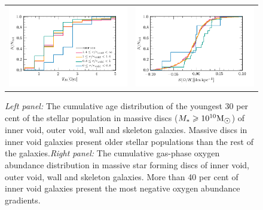 \documentclass[a4paper,fleqn,usenatbib,letter]{mnras}
\newcommand{\Msun}{\rm M_{\sun}}
\begin{document}
\begin{figure}	
    \begin{tabular}{cc}
	\includegraphics[width=1\columnwidth]{plots_parent_sample/T30_fraction_threeregionscum.png} &
	\includegraphics[width=1\columnwidth]{plots_parent_sample/SOH_fraction_threeregionscum.png} \\
	\end{tabular}
    \caption{\textit{ Left panel:} The cumulative  age distribution  of the youngest 30 per cent of the stellar population in massive discs ($M_{*}\geq 10^{10}\Msun$) of inner void, outer void, wall and skeleton galaxies. Massive discs in inner void galaxies present older stellar populations than the rest of the galaxies.\textit{Right panel:} The cumulative  gas-phase oxygen abundance distribution in massive star forming discs of inner void, outer void, wall and skeleton galaxies. More than 40 per cent of inner void galaxies present the most negative  oxygen abundance gradients.}    \label{fig:discs}
\end{figure}
\end{document}
